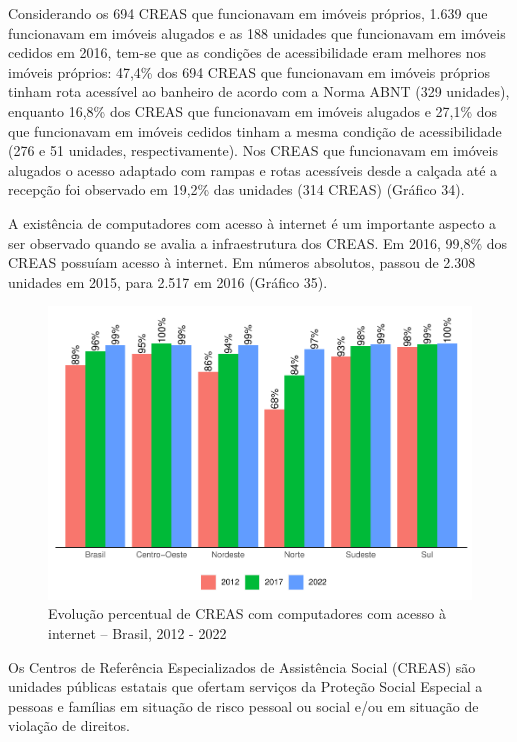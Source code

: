 \documentclass[
  brazilian]{report}
\begin{document}
Considerando os 694 CREAS que funcionavam em imóveis próprios, 1.639 que
funcionavam em imóveis alugados e as 188 unidades que funcionavam em
imóveis cedidos em 2016, tem-se que as condições de acessibilidade eram
melhores nos imóveis próprios: 47,4\% dos 694 CREAS que funcionavam em
imóveis próprios tinham rota acessível ao banheiro de acordo com a Norma
ABNT (329 unidades), enquanto 16,8\% dos CREAS que funcionavam em
imóveis alugados e 27,1\% dos que funcionavam em imóveis cedidos tinham
a mesma condição de acessibilidade (276 e 51 unidades, respectivamente).
Nos CREAS que funcionavam em imóveis alugados o acesso adaptado com
rampas e rotas acessíveis desde a calçada até a recepção foi observado
em 19,2\% das unidades (314 CREAS) (Gráfico 34).

A existência de computadores com acesso à internet é um importante
aspecto a ser observado quando se avalia a infraestrutura dos CREAS. Em
2016, 99,8\% dos CREAS possuíam acesso à internet. Em números absolutos,
passou de 2.308 unidades em 2015, para 2.517 em 2016 (Gráfico 35).

\begin{figure}
\includegraphics{Censo-SUAS-2022_files/figure-latex/CREAS-internet-percentual-1} \caption[Evolução percentual de CREAS com computadores com acesso à internet – Brasil, 2012 - 2022]{Evolução percentual de CREAS com computadores com acesso à internet – Brasil, 2012 - 2022}\label{fig:CREAS-internet-percentual}
\end{figure}

Os Centros de Referência Especializados de Assistência Social (CREAS)
são unidades públicas estatais que ofertam serviços da Proteção Social
Especial a pessoas e famílias em situação de risco pessoal ou social
e/ou em situação de violação de direitos.
\end{document}

